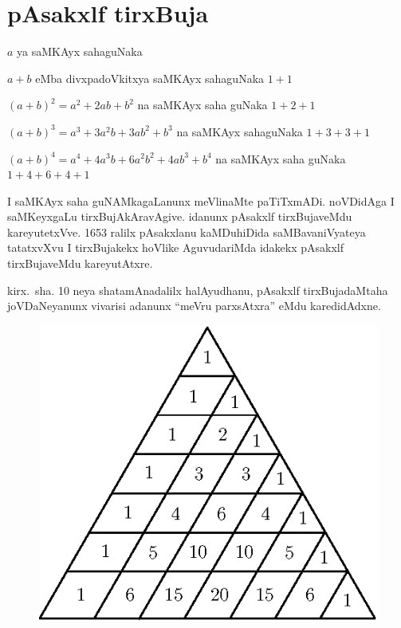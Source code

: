\chapter{pAsakxlf tirxBuja}

\vskip -25pt
\noindent
$a$ ya saMKAyx sahaguNaka 

\noindent
$a+b$ eMba divxpadoVkitxya saMKAyx sahaguNaka \quad $1+1$

\noindent
$(a+b)^2=a^2+2ab+b^2$ na saMKAyx saha guNaka \quad $1+2+1$

\noindent
$(a+b)^3=a^3+3a^2b+3ab^2+b^3$ na saMKAyx sahaguNaka \quad $1+3+3+1$

\noindent
$(a+b)^4=a^4+4a^3b+6a^2b^2+4ab^3+b^4$ na saMKAyx saha guNaka \quad $1+4+6+4+1$

I saMKAyx saha guNAMkagaLanunx meVlinaMte paTiTxmADi. noVDidAga I saMKeyxgaLu tirxBujAkAravAgive. idanunx pAsakxlf tirxBujaveMdu kareyutetxVve. {\rm 1653} ralilx pAsakxlanu kaMDuhiDida saMBavaniVyateya tatatxvXvu I tirxBujakekx hoVlike AguvudariMda idakekx pAsakxlf tirxBujaveMdu kareyutAtxre.

kirx.~sha. {\rm 10} neya shatamAnadalilx halAyudhanu, pAsakxlf tirxBujadaMtaha joVDaNe\-yanunx vivarisi adanunx ``meVru parxsAtxra'' eMdu karedidAdxne.
\hspace{2.5cm}
\begin{figure}[H]
\centering
\includegraphics[scale=.7]{src/figures/m_151.eps}
\end{figure}
\centerline{}

